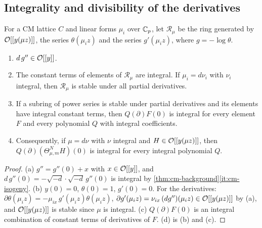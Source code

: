 \subsection{Integrality and divisibility of the derivatives}\label{ss:jet-integrality}
For a CM lattice $C$ and linear forms $\mu_i$ over $\mathbb{C}_p$, let $\mathcal R_\mu$ be the ring generated by
$\mathcal{O}[[y(\mu z)]]$, the series $\theta(\mu_iz)$ and the series $g'(\mu_iz)$, where $g=-\log\theta$.

\begin{lemma}\label{lem:jet-ring}
\begin{enumerate}[label=\textup{(\alph*)}]
\item $d\,g''\in\mathcal{O}[[y]]$.
\item The constant terms of elements of $\mathcal R_\mu$ are integral. If $\mu_i=d\nu_i$ with $\nu_i$
integral, then $\mathcal R_\mu$ is stable under all partial derivatives.
\item If a subring of power series is stable under partial derivatives and its elements have integral
constant terms, then $Q(\partial)F(0)$ is integral for every element $F$ and every polynomial $Q$ with
integral coefficients.
\item Consequently, if $\mu=d\nu$ with $\nu$ integral and $H\in\mathcal{O}[[y(\mu z)]]$, then
$Q(\partial)(\Theta_{\mu,m}^NH)(0)$ is integral for every integral polynomial $Q$.
\end{enumerate}
\end{lemma}

\begin{proof}
(a) $g''=g''(0)+x$ with $x\in\mathcal{O}[[y]]$, and $d\,g''(0)=-\sqrt{-d}\cdot\sqrt{-d}\,g''(0)$ is integral by
\cref{thm:cm-background}\ref{it:cm-isogeny}. (b) $y(0)=0$, $\theta(0)=1$, $g'(0)=0$. For the derivatives:
$\partial\theta(\mu_iz)=-\mu_{ix}\,g'(\mu_iz)\theta(\mu_iz)$, $\partial g'(\mu_iz)=\nu_{ix}\,(dg'')(\mu_iz)\in
\mathcal{O}[[y(\mu z)]]$ by (a), and $\mathcal{O}[[y(\mu z)]]$ is stable since $\mu$ is integral. (c) $Q(\partial)F(0)$ is
an integral combination of constant terms of derivatives of $F$. (d) is (b) and (c).
\end{proof}

